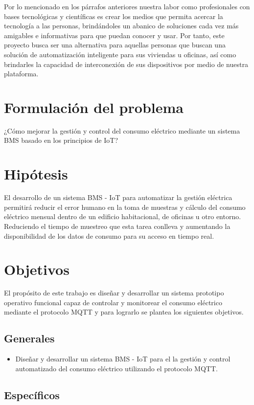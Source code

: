 Por lo mencionado en los párrafos anteriores nuestra labor como profesionales con bases tecnológicas y científicas es crear los medios que permita acercar la tecnología a las personas, brindándoles un abanico de soluciones cada vez más amigables e informativas para que puedan conocer y usar. Por tanto, este proyecto busca ser una alternativa para aquellas personas que buscan una solución de automatización inteligente para sus viviendas u oficinas, así como brindarles la capacidad de interconexión de sus dispositivos por medio de nuestra plataforma.

\section{Formulación del problema}

¿Cómo mejorar la gestión y control del consumo eléctrico mediante un sistema BMS basado en los principios de IoT?

\section{Hipótesis}

El desarrollo de un sistema BMS - IoT para automatizar la gestión eléctrica permitirá reducir el error humano en la toma de muestras y cálculo del consumo eléctrico mensual dentro de un edificio habitacional, de oficinas u otro entorno. Reduciendo el tiempo de muestreo que esta tarea conlleva y aumentando la disponibilidad de los datos de consumo para su acceso en tiempo real.

\section{Objetivos}

El propósito de este trabajo es diseñar y desarrollar un sistema prototipo operativo funcional capaz de controlar y monitorear el consumo eléctrico mediante el protocolo MQTT y para lograrlo se plantea los siguientes objetivos.

\subsection{Generales}
\begin{itemize}
\item Diseñar y desarrollar un sistema BMS - IoT para el la gestión y control 
automatizado del consumo eléctrico utilizando el protocolo MQTT.
\end{itemize}
\subsection{Específicos}

